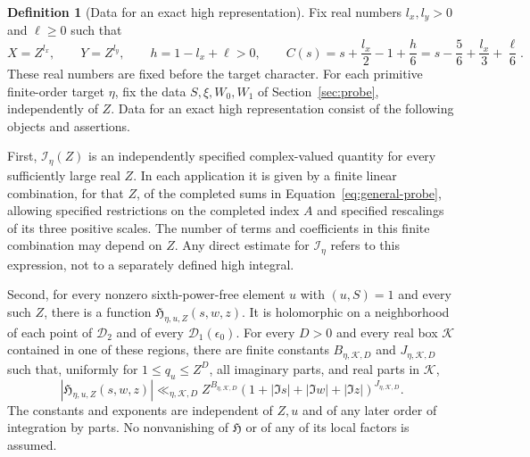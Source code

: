 \documentclass[11pt,a4paper]{article}
\numberwithin{equation}{section}
\numberwithin{figure}{section}
\theoremstyle{definition}
\newtheorem{definition}[theorem]{Definition}
\theoremstyle{remark}
\begin{document}
\begin{definition}[Data for an exact high representation]
\label{def:stage-high-data}
Fix real numbers $l_x,l_y>0$ and $\ell\ge0$ such that
\begin{equation}
 X=Z^{l_x},\qquad Y=Z^{l_y},\qquad h=1-l_x+\ell>0,
 \qquad
 C(s)=s+\frac{l_x}{2}-1+\frac h6
     =s-\frac56+\frac{l_x}{3}+\frac\ell6.
 \label{eq:stage-mellin-exponent}
\end{equation}
These real numbers are fixed before the target character.  For each
primitive finite-order target $\eta$, fix the data $S,\xi,W_0,W_1$ of
Section~\ref{sec:probe}, independently of $Z$.  Data for an exact high
representation consist of the following objects and assertions.

First, $\mathscr I_\eta(Z)$ is an independently specified complex-valued
quantity for every sufficiently large real $Z$.  In each application it
is given by a finite linear combination, for that $Z$, of the completed
sums in Equation~\eqref{eq:general-probe}, allowing specified restrictions
on the completed index $A$ and specified rescalings of its three positive
scales.  The number of terms and coefficients in this finite combination
may depend on $Z$.  Any direct estimate for $\mathscr I_\eta$ refers to
this expression, not to a separately defined high integral.

Second, for every nonzero sixth-power-free element $u$ with $(u,S)=1$ and
every such $Z$, there is a function
$\mathfrak H_{\eta,u,Z}(s,w,z)$.  It is holomorphic on a neighborhood of
each point of $\mathcal D_2$ and of every $\mathcal D_1(\epsilon_0)$.
For every $D>0$ and every real box $\mathcal K$ contained in one of these
regions, there are finite constants $B_{\eta,\mathcal K,D}$ and
$J_{\eta,\mathcal K,D}$ such that, uniformly for
$1\le q_u\le Z^D$, all imaginary parts, and real parts in $\mathcal K$,
\begin{equation}
 |\mathfrak H_{\eta,u,Z}(s,w,z)|
 \ll_{\eta,\mathcal K,D}
 Z^{B_{\eta,\mathcal K,D}}
 (1+|\Im s|+|\Im w|+|\Im z|)^{J_{\eta,\mathcal K,D}}.
 \label{eq:stage-all-height-majorant}
\end{equation}
The constants and exponents are independent of $Z,u$ and of any later
order of integration by parts.  No nonvanishing of $\mathfrak H$ or of
any of its local factors is assumed.


\end{definition}
\end{document}
